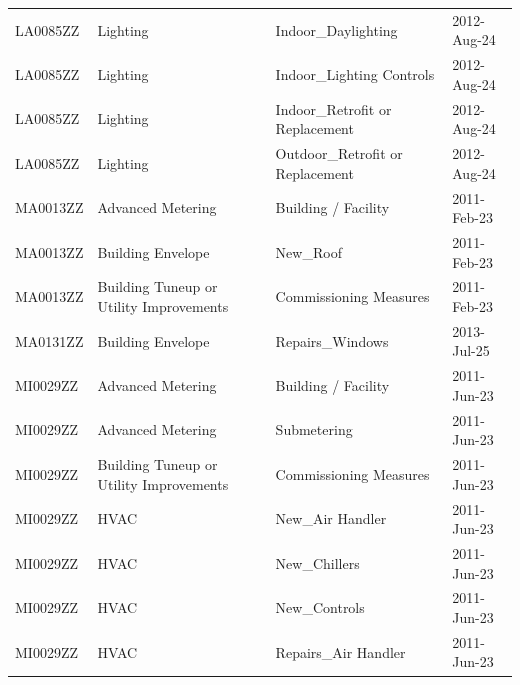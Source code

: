 \documentclass[12pt]{article}
\begin{document}
\begin{longtable}{lp{4cm}p{4cm}p{3cm}}
LA0085ZZ         & Lighting                                & Indoor\_Daylighting                       & 2012-Aug-24                   \\
LA0085ZZ         & Lighting                                & Indoor\_Lighting Controls                 & 2012-Aug-24                   \\
LA0085ZZ         & Lighting                                & Indoor\_Retrofit or Replacement           & 2012-Aug-24                   \\
LA0085ZZ         & Lighting                                & Outdoor\_Retrofit or Replacement          & 2012-Aug-24                   \\
MA0013ZZ         & Advanced Metering                       & Building / Facility                       & 2011-Feb-23                   \\
MA0013ZZ         & Building Envelope                       & New\_Roof                                 & 2011-Feb-23                   \\
MA0013ZZ         & Building Tuneup or Utility Improvements & Commissioning Measures                    & 2011-Feb-23                   \\
MA0131ZZ         & Building Envelope                       & Repairs\_Windows                          & 2013-Jul-25                   \\
MI0029ZZ         & Advanced Metering                       & Building / Facility                       & 2011-Jun-23                   \\
MI0029ZZ         & Advanced Metering                       & Submetering                               & 2011-Jun-23                   \\
MI0029ZZ         & Building Tuneup or Utility Improvements & Commissioning Measures                    & 2011-Jun-23                   \\
MI0029ZZ         & HVAC                                    & New\_Air Handler                          & 2011-Jun-23                   \\
MI0029ZZ         & HVAC                                    & New\_Chillers                             & 2011-Jun-23                   \\
MI0029ZZ         & HVAC                                    & New\_Controls                             & 2011-Jun-23                   \\
MI0029ZZ         & HVAC                                    & Repairs\_Air Handler                      & 2011-Jun-23                   \\

\end{longtable}
\end{document}
